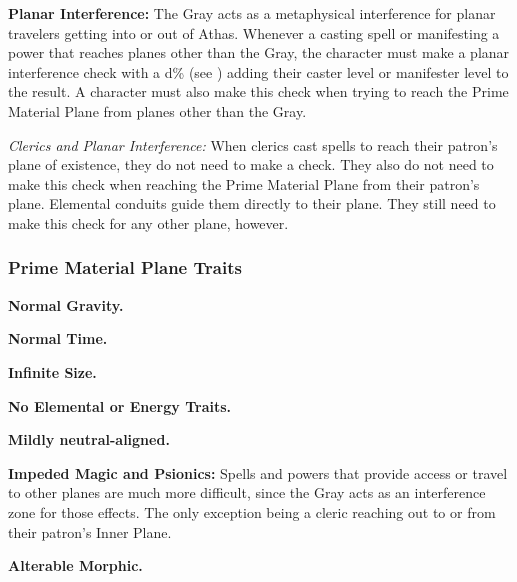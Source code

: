 \textbf{Planar Interference:} The Gray acts as a metaphysical interference for planar travelers getting into or out of Athas. Whenever a casting spell or manifesting a power that reaches planes other than the Gray, the character must make a planar interference check with a d\% (see ) adding their caster level or manifester level to the result. A character must also make this check when trying to reach the Prime Material Plane from planes other than the Gray.


\textit{Clerics and Planar Interference:} When clerics cast spells to reach their patron's plane of existence, they do not need to make a check. They also do not need to make this check when reaching the Prime Material Plane from their patron's plane. Elemental conduits guide them directly to their plane. They still need to make this check for any other plane, however.

\subsubsection{Prime Material Plane Traits}
\begin{itemize*}
\item \textbf{Normal Gravity.}
\item \textbf{Normal Time.}
\item \textbf{Infinite Size.}
\item \textbf{No Elemental or Energy Traits.}
\item \textbf{Mildly neutral-aligned.}
\item \textbf{Impeded Magic and Psionics:} Spells and powers that provide access or travel to other planes are much more difficult, since the Gray acts as an interference zone for those effects. The only exception being a cleric reaching out to or from their patron's Inner Plane.
\item \textbf{Alterable Morphic.}
\end{itemize*}

